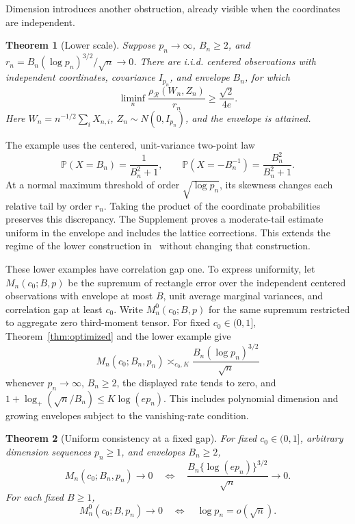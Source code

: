 \documentclass[11pt,letterpaper]{article}
\newtheorem{theorem}{Theorem}
\theoremstyle{remark}
\newcommand{\Pp}{\mathbb P}
\newcommand{\rh}{\rho_{\mathcal R}}
\begin{document}
Dimension introduces another obstruction, already visible when the
coordinates are independent.
\begin{theorem}[Lower scale]\label{opt:skew-lower}
Suppose \(p_n\to\infty\), \(B_n\ge2\), and
\(r_n=B_n(\log p_n)^{3/2}/\sqrt n\to0\). There are i.i.d.
centered observations with independent coordinates, covariance
\(I_{p_n}\), and envelope \(B_n\), for which
\begin{equation}
 \liminf_n\frac{\rh(W_n,Z_n)}{r_n}\ge\frac{\sqrt2}{4e}.
 \label{opt:lower-constant}
\end{equation}
Here \(W_n=n^{-1/2}\sum_iX_{n,i}\),
\(Z_n\sim N(0,I_{p_n})\), and the envelope is attained.
\end{theorem}
The example uses the centered, unit-variance two-point law
\[
 \Pp(X=B_n)=\frac1{B_n^2+1},\qquad
 \Pp(X=-B_n^{-1})=\frac{B_n^2}{B_n^2+1}.
\]
At a normal maximum threshold of order \(\sqrt{\log p_n}\), its
skewness changes each relative tail by order \(r_n\). Taking the
product of the coordinate probabilities preserves this discrepancy.
The Supplement proves a moderate-tail estimate uniform in the envelope
and includes the lattice corrections. This extends the regime of the
lower construction in~\cite{CCK} without changing that construction.

These lower examples have correlation gap one. To express uniformity,
let \(M_n(c_0;B,p)\) be the supremum of rectangle error over the
independent centered observations with envelope at most \(B\), unit
average marginal variances, and correlation gap at least \(c_0\).
Write \(M_n^0(c_0;B,p)\) for the same supremum restricted to
aggregate zero third-moment tensor.
For fixed \(c_0\in(0,1]\), Theorem~\ref{thm:optimized} and the lower
example give
\begin{equation}
 M_n(c_0;B_n,p_n)\asymp_{c_0,K}
 \frac{B_n(\log p_n)^{3/2}}{\sqrt n}
 \label{opt:matching-minimax}
\end{equation}
whenever \(p_n\to\infty\), \(B_n\ge2\), the displayed rate tends
to zero, and \(1+\log_+(\sqrt n/B_n)\le K\log(ep_n)\).
This includes polynomial dimension and growing envelopes subject to
the vanishing-rate condition.

\begin{theorem}[Uniform consistency at a fixed gap]
\label{opt:consistency}
For fixed \(c_0\in(0,1]\), arbitrary dimension sequences \(p_n\ge1\),
and envelopes \(B_n\ge2\),
\begin{equation}
 M_n(c_0;B_n,p_n)\longrightarrow0
 \quad\Longleftrightarrow\quad
 \frac{B_n\{\log(ep_n)\}^{3/2}}{\sqrt n}\longrightarrow0.
 \label{opt:consistency-iff}
\end{equation}
For each fixed \(B\ge1\),
\[
 M_n^0(c_0;B,p_n)\longrightarrow0
 \quad\Longleftrightarrow\quad \log p_n=o(\sqrt n).
\]
\end{theorem}
\end{document}
